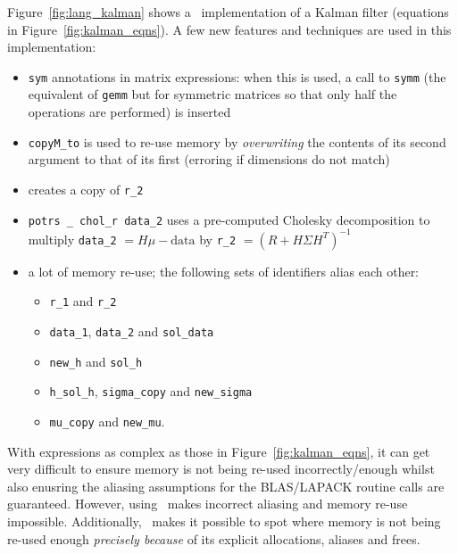 Figure~\ref{fig:lang_kalman} shows a \lang\ implementation of a Kalman filter
(equations in Figure~\ref{fig:kalman_eqns}). A few new features and techniques
are used in this implementation:
\begin{itemize}

    \item \texttt{sym} annotations in matrix expressions: when this is used, a 
        call to \texttt{symm} (the equivalent of \texttt{gemm} but for
        symmetric matrices so that only half the operations are performed) is
        inserted

    \item \texttt{copyM\_to} is used to re-use memory by \emph{overwriting} the
        contents of its second argument to that of its first (erroring if
        dimensions do not match)

    \item {} creates a copy of \texttt{r\_2}

    \item \texttt{potrs \_ chol\_r data\_2} uses a pre-computed Cholesky decomposition
        to multiply \texttt{data\_2} $ = H \mu - \textrm{data}$ by
        \texttt{r\_2} $= (R + H \Sigma H^T)^{-1}$

    \item a lot of memory re-use; the following sets of identifiers alias each other:
        \begin{itemize}
            \item \texttt{r\_1} and \texttt{r\_2}
            \item \texttt{data\_1}, \texttt{data\_2} and \texttt{sol\_data}
            \item \texttt{new\_h} and \texttt{sol\_h}
            \item \texttt{h\_sol\_h}, \texttt{sigma\_copy} and \texttt{new\_sigma}
            \item \texttt{mu\_copy} and \texttt{new\_mu}.
        \end{itemize}

\end{itemize}

With expressions as complex as those in Figure~\ref{fig:kalman_eqns}, it can
get very difficult to ensure memory is not being re-used incorrectly/enough
whilst also enusring the aliasing assumptions for the BLAS/LAPACK routine calls
are guaranteed. However, using \lang\ makes incorrect aliasing and memory
re-use impossible. Additionally, \lang\ makes it possible to spot where memory
is not being re-used enough \emph{precisely because} of its explicit
allocations, aliases and frees.
